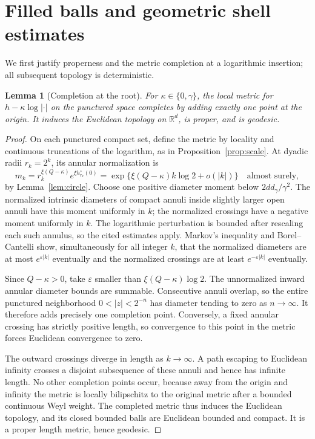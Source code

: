 \documentclass[11pt,reqno]{amsart}
\theoremstyle{plain}
\newtheorem{lemma}[theorem]{Lemma}
\theoremstyle{definition}
\theoremstyle{remark}
\newcommand{\R}{\mathbb R}
\newcommand{\1}{\mathbf{1}}
\begin{document}
\section{Filled balls and geometric shell estimates}\label{sec:geometry}
We first justify properness and the metric completion at a logarithmic insertion; all subsequent topology is deterministic.

\begin{lemma}[Completion at the root]\label{lem:completion}
For $\kappa\in\{0,\gamma\}$, the local metric for $h-\kappa\log|\cdot|$ on the punctured space completes by adding exactly one point at the origin. It induces the Euclidean topology on $\R^d$, is proper, and is geodesic.
\end{lemma}
\begin{proof}
On each punctured compact set, define the metric by locality and continuous truncations of the logarithm, as in Proposition~\ref{prop:scale}. At dyadic radii $r_k=2^k$, its annular normalization is
\begin{equation*}
m_k=r_k^{\xi(Q-\kappa)}e^{\xi h_{r_k}^\circ(0)}
=\exp\{\xi(Q-\kappa)k\log2+o(|k|)\}\quad\text{almost surely},
\end{equation*}
by Lemma~\ref{lem:circle}. Choose one positive diameter moment below $2dd_\gamma/\gamma^2$. The normalized intrinsic diameters of compact annuli inside slightly larger open annuli have this moment uniformly in $k$; the normalized crossings have a negative moment uniformly in $k$. The logarithmic perturbation is bounded after rescaling each such annulus, so the cited estimates apply. Markov's inequality and Borel--Cantelli show, simultaneously for all integer $k$, that the normalized diameters are at most $e^{\varepsilon|k|}$ eventually and the normalized crossings are at least $e^{-\varepsilon|k|}$ eventually.

Since $Q-\kappa>0$, take $\varepsilon$ smaller than $\xi(Q-\kappa)\log2$. The unnormalized inward annular diameter bounds are summable. Consecutive annuli overlap, so the entire punctured neighborhood $0<|z|<2^{-n}$ has diameter tending to zero as $n\to\infty$. It therefore adds precisely one completion point. Conversely, a fixed annular crossing has strictly positive length, so convergence to this point in the metric forces Euclidean convergence to zero.

The outward crossings diverge in length as $k\to\infty$. A path escaping to Euclidean infinity crosses a disjoint subsequence of these annuli and hence has infinite length. No other completion points occur, because away from the origin and infinity the metric is locally bilipschitz to the original metric after a bounded continuous Weyl weight. The completed metric thus induces the Euclidean topology, and its closed bounded balls are Euclidean bounded and compact. It is a proper length metric, hence geodesic.
\end{proof}
\end{document}
